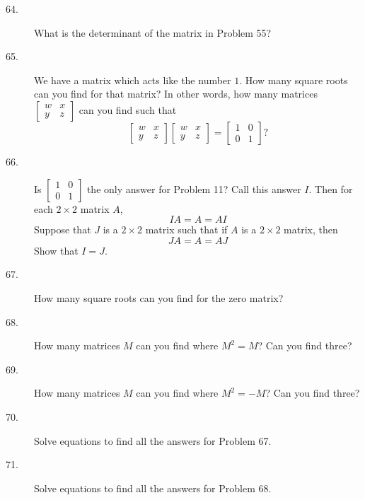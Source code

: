 \documentclass{article}
\begin{document}
\begin{description}
  \item[64.] What is the determinant of the matrix in Problem 55?

  \item[65.] We have a matrix which acts like the number $1$. How many square roots can you find for that matrix? In other words, how many matrices $\begin{bmatrix} w & x \\ y & z \end{bmatrix}$ can you find such that 
    \begin{equation*}
    \begin{bmatrix} w & x \\ y & z \end{bmatrix} \begin{bmatrix} w & x \\ y & z \end{bmatrix}
    = \begin{bmatrix} 1 & 0 \\ 0 & 1 \end{bmatrix} ?
    \end{equation*}

  \item[66.] Is $\begin{bmatrix} 1 & 0 \\ 0 & 1 \end{bmatrix}$ the only answer for Problem 11? Call this answer $I$. Then for each $2 \times 2$ matrix $A$, 
    \begin{equation*}
    IA = A = AI
    \end{equation*}
    Suppose that $J$ is a $2 \times 2$ matrix such that if $A$ is a $2 \times 2$ matrix, then 
    \begin{equation*}
    JA = A = AJ
    \end{equation*}
    Show that $I = J$. 

  \item[67.] How many square roots can you find for the zero matrix? 

  \item[68.] How many matrices $M$ can you find where $M^2 = M$? Can you find three? 

  \item[69.] How many matrices $M$ can you find where $M^2 = -M$? Can you find three? 

  \item[70.] Solve equations to find all the answers for Problem 67.

  \item[71.] Solve equations to find all the answers for Problem 68.


\end{description}
\end{document}

